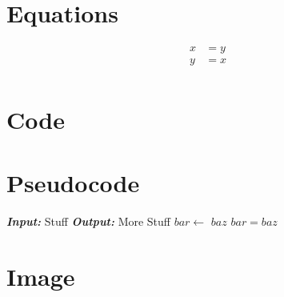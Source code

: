 \documentclass[11pt]{article}
\begin{document}
\section{Equations}

\begin{align*}
  x &= y \\
  y &= x \\
\end{align*}

\newpage

\section{Code}

% 

\newpage

\section{Pseudocode}

\begin{algorithm}
\begin{algorithmic}[1]
    \State \textbf{\textit{Input:}} Stuff
    \State \textbf{\textit{Output:}} More Stuff
      \State $bar \gets$ $baz$
      \State $bar = baz$
    \EndWhile
  \EndProcedure
\end{algorithmic}
\end{algorithm}

\newpage

\section{Image}

\end{document}
